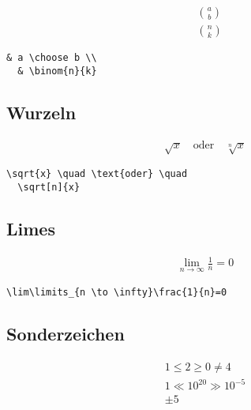 \begin{align}
  & a \choose b \\
  & \binom{n}{k}
\end{align}

\lstset{language=[LaTeX]TeX } %
\begin{lstlisting}[gobble=2, frame=none, numbers=none, backgroundcolor=\color{white},%
	caption={},label={code:}]
	& a \choose b \\
  & \binom{n}{k}
\end{lstlisting}


\subsection{Wurzeln}\label{wurzeln}

\begin{align}
  \sqrt{x} \quad \text{oder} \quad
  \sqrt[n]{x}
\end{align}

\lstset{language=[LaTeX]TeX } %
\begin{lstlisting}[gobble=2, frame=none, numbers=none, backgroundcolor=\color{white},%
	caption={},label={code:}]
	\sqrt{x} \quad \text{oder} \quad
  \sqrt[n]{x}
\end{lstlisting}


\subsection{Limes}\label{limes}

\begin{align}
  \lim\limits_{n \to \infty}\frac{1}{n}=0
\end{align}

\lstset{language=[LaTeX]TeX } %
\begin{lstlisting}[gobble=2, frame=none, numbers=none, backgroundcolor=\color{white},%
	caption={},label={code:}]
	\lim\limits_{n \to \infty}\frac{1}{n}=0
\end{lstlisting}


\subsection{Sonderzeichen}\label{sonderzeichen}

\begin{align}
  1 \le 2 \ge 0 \neq 4 \\
  1 \ll 10^{20} \gg 10^{-5} \\
  \pm 5
\end{align}

